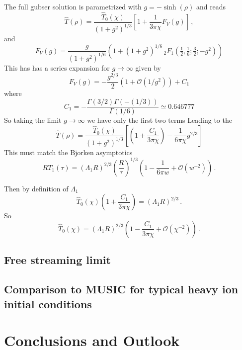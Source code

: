 \documentclass[12pt,aps,preprint,nofootinbib,noshowkeys,noshowpacs,longbibliography,superscriptaddress,tightenlines]{revtex4-2}
\def\st{\begin{equation}}
\def\stp{\end{equation}}
\begin{document}
The full gubser solution is parametrized
with $g=-\sinh(\rho)$ and reads
\begin{equation}
  \hat{T}(\rho) = \frac{\hat{T}_0(\chi)} 
   {(1 + g^2)^{1/3}} 
  \left[ 1 + 
 \frac{1}{3\pi \chi}  F_V (g) \right] \, , 
\end{equation}
and 
\begin{equation}
F_V(g)  =  \frac{g }{(1 + g^2)^{1/6} } \left(1 + (1 + g^2)^{1/6} \, _2F_1\left(\tfrac{1}{2},\tfrac{1}{6}; \tfrac{3}{2}; -g^2\right) \right) 
\end{equation}
This has  has a series expansion for $g \rightarrow \infty$ given by
\begin{equation}
F_V(g) = -\frac{g^{2/3}}{2}\left( 1 + \mathcal O(1/g^2)\right) +  C_1 
\end{equation}
where 
\begin{equation}
C_1 = - \frac{ \Gamma(3/2) \Gamma(-(1/3))}{\Gamma(1/6)}  \simeq 0.646777
\end{equation}
So taking the limit $g \rightarrow \infty$ we have only the first two terms
Leading to the 
\begin{equation}
  \hat{T}(\rho) = \frac{\hat{T}_0(\chi)} 
   {(1 + g^2)^{1/3}} 
  \left[ \left(1 + \frac{C_1}{3\pi \chi} \right)  
-  \frac{1}{6\pi \chi} g^{2/3}  \right] 
\end{equation}
This must match the Bjorken asymptotics 
\st
   R T_1 (\tau)= (\Lambda_1 R)^{2/3} \left( \frac{R}{\tau} \right)^{1/3} \left( 1 - \frac{1}{6\pi w} + \mathcal O(w^{-2}) \right) \, .
\stp

Then by definition of $\Lambda_1$
\begin{equation}
\hat{T}_0(\chi)\left(1 + \frac{C_1}{3\pi\chi} \right) = (\Lambda_1 R)^{2/3} \, .
\end{equation}
So 
\begin{equation}
  \hat{T}_0(\chi) = (\Lambda_1 R)^{2/3} \left(1 - \frac{C_1}{3\pi\chi} + \mathcal O(\chi^{-2}) \right) \, .
\end{equation}

\subsection{Free streaming limit}



\subsection{Comparison to MUSIC for typical heavy ion initial conditions}

\section{Conclusions and Outlook}



\end{document}
